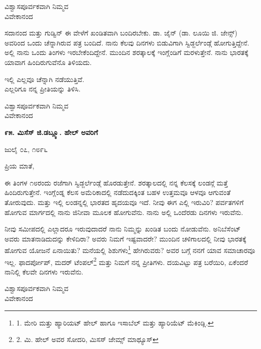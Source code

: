 \begin{flushright}
ವಿಶ್ವಾಸಪೂರ್ವಕವಾಗಿ ನಿಮ್ಮವ\\ವಿವೇಕಾನಂದ
\end{flushright}

ಸದಾನಂದ ಮತ್ತು ಗುಡ್ವಿನ್ ಈ ವೇಳೆಗೆ ಖಂಡಿತವಾಗಿ ಬಂದಿರಬೇಕು. ಡಾ. ಜೈನ್ (ಡಾ. ಲೂಯಿ ಜಿ. ಜೇನ್ಸ್) ಅವರಿಂದ ಒಂದು ಚೆನ್ನಾಗಿರುವ ಪತ್ರ ಬಂದಿದೆ. ನಾನು ಕೆಲವು ದಿನಗಳು ಬಿಡುವಿಗಾಗಿ ಸ್ವಿಡ್ಜರ್ಲೆಂಡ್ಗೆ ಹೋಗುತ್ತಿದ್ದೇನೆ. ಅಲ್ಲಿ ನಾನು ಒಂದು ತಿಂಗಳು ಇರಬೇಕೆಂದಿದ್ದೇನೆ. ಮುಂದಿನ ಶರತ್ಕಾಲಕ್ಕೆ ಇಂಗ್ಲೆಂಡಿಗೆ ಮರಳುತ್ತೇನೆ. ನಾನು ಭಾರತಕ್ಕೆ ಯಾವಾಗ ಹಿಂದಿರುಗುವೆನೊ ತಿಳಿಯದು.

\begin{myquote}
ಇಲ್ಲಿ ಎಲ್ಲವೂ ಚೆನ್ನಾಗಿ ನಡೆಯುತ್ತಿವೆ.\\ಎಲ್ಲರಿಗೂ ನನ್ನ ಪ್ರೀತಿಯನ್ನು ತಿಳಿಸಿ.
\end{myquote}

\begin{flushright}
ವಿಶ್ವಾಸಪೂರ್ವಕವಾಗಿ ನಿಮ್ಮವ\\ವಿವೇಕಾನಂದ
\end{flushright}

\begin{center}
\textbf{೯೫. ಮಿಸೆಸ್ ಜಿ.ಡಬ್ಲ್ಯೂ. ಹೇಲ್ ಅವರಿಗೆ}
\end{center}

\begin{flushright}
ಜುಲೈ ೦೭, ೧೮೯೬
\end{flushright}

ಪ್ರಿಯ ಮಾತೆ,

ಈ ತಿಂಗಳ ೧೮ರಂದು ರಜೆಗಾಗಿ ಸ್ವಿಡ್ಜರ್ಲೆಂಡ್ಗೆ ಹೊರಡುತ್ತೇನೆ. ಶರತ್ಕಾಲದಲ್ಲಿ ನನ್ನ ಕೆಲಸಕ್ಕೆ ಲಂಡನ್ಗೆ ಮತ್ತೆ ಹಿಂದಿರುಗುತ್ತೇನೆ. ಇಂಗ್ಲೆಂಡ್ನ ಕೆಲಸ ಅಮೆರಿಕಾದಲ್ಲಿ ನಡೆದುದಕ್ಕಿಂತ ಬಹಳ ಉತ್ತಮವೂ ಆಳವೂ ಆಗುವಂತೆ ತೋರುವುದು. ಮತ್ತು ಇಲ್ಲಿ ಲಂಡನ್ನಲ್ಲಿ ಭಾರತದ ಹೃದಯವೂ ಇದೆ. ನೀವು ಈಗ ಎಲ್ಲಿ ಇರುವಿರಿ? ಪರ್ವತಗಳಿಗೆ ಹೋಗುವ ಮಾರ್ಗದಲ್ಲಿ ನಾನು ಜಿನೀವಾ ಮೂಲಕ ಹೋಗುವೆನು. ನಾನು ಅಲ್ಲಿ ಒಂದೆರಡು ದಿನಗಳು ಇರುವೆನು.

ನೀವು ಸಮೀಪದಲ್ಲಿ ಎಲ್ಲಾದರೂ ಇರುವುದಾದರೆ ನಾನು ನಿಮ್ಮನ್ನು ಖಂಡಿತ ಬಂದು ನೋಡುವೆನು. ಅನಿಬೆಸೆಂಟ್ ಅವರು ಮಾತನಾಡಿದುದನ್ನು ಕೇಳಿದಿರಾ? ಅವರು ನಿಮಗೆ ಇಷ್ಟವಾದರೇ? ಮುಂದಿನ ಚಳಿಗಾಲದಲ್ಲಿ ನೀವು ಭಾರತಕ್ಕೆ ಹೋಗುವ ಯೋಜನೆ ಏನಾಯಿತು? ಮನೆಯಲ್ಲಿ ಶಿಶುಗಳು\footnote{1. ಮೇರಿ ಮತ್ತು ಹ್ಯಾರಿಯಟ್ ಹೇಲ್ ಹಾಗೂ ಇಸಾಬೆಲ್ ಮತ್ತು ಹ್ಯಾರಿಯೆಟ್ ಮೆಕಿಂಡ್ಲಿ.} ಹೇಗಿರುವರು? ಅವರ ಬಗ್ಗೆ ನನಗೆ ಯಾವ ಸಮಾಚಾರವೂ ಇಲ್ಲ. ಫಾದರ್ಪೋಪ್, ಮದರ್ ಟೆಂಪಲ್\footnote{2. ಮಿ. ಹೇಲ್ ಅವರ ಸೋದರಿ, ಮಿಸಸ್ ಜೇಮ್ಸ್ ಮಾಥ್ಯೂಸ್} ಮತ್ತು ನಿಮಗೆ ನನ್ನ ಪ್ರೀತಿಗಳು. ದಯವಿಟ್ಟು ಪತ್ರ ಬರೆಯಿರಿ, ಏಕೆಂದರೆ ನಾನಿಲ್ಲಿ ಕೆಲವೇ ದಿನಗಳು ಇರುವೆನು.

\begin{flushright}
ವಿಶ್ವಾಸಪೂರ್ವಕವಾಗಿ ನಿಮ್ಮವ\\ವಿವೇಕಾನಂದ
\end{flushright}


